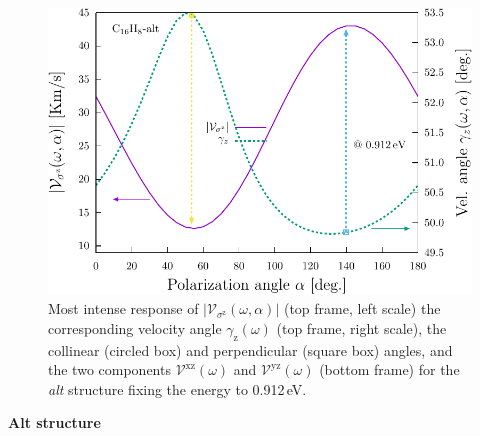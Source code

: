 \documentclass[prb,11pt,tightenlines,twocolumn,aps]{revtex4-1}
\begin{document}
\begin{figure}[t]
    \centering
    \includegraphics[width=\linewidth]{altplots/alt-vaz-rag}
    \caption{Most intense response of
    $|\mathcal{V}_{\sigma^{\mathrm{z}}}(\omega,\alpha)|$ (top frame, left
    scale) the corresponding velocity angle $\gamma_{\mathrm{z}}(\omega)$ (top
    frame, right scale), the collinear (circled box) and perpendicular (square
    box) angles, and the two components $\mathcal{V}^{\mathrm{xz}}(\omega)$ and
    $\mathcal{V}^{\mathrm{yz}}(\omega)$ (bottom frame) for the \emph{alt}
    structure fixing the energy to 0.912\,eV.}
    \label{fig:alt-vaz-rag}
\end{figure}


\textbf{Alt structure}
\end{document}
